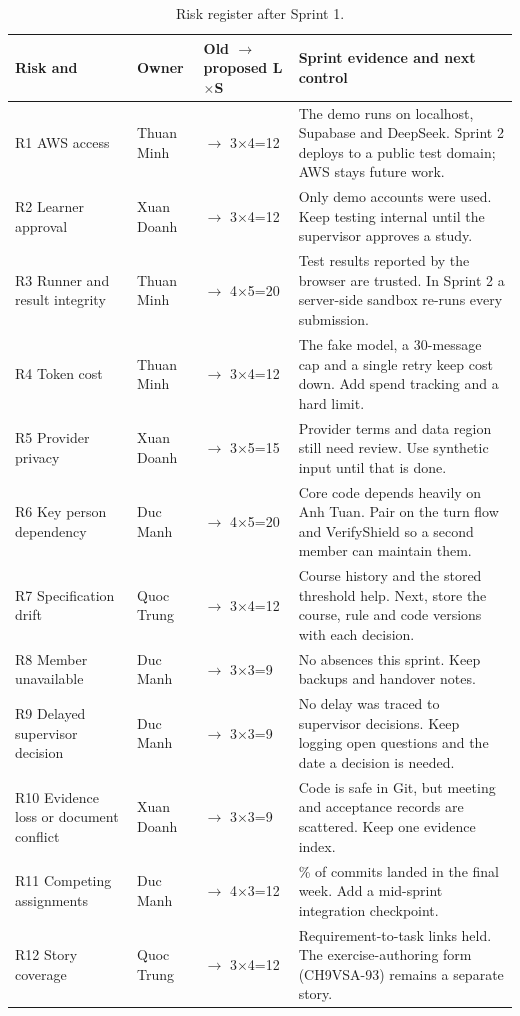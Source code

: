 \documentclass[11pt,a4paper]{article}
\begin{document}
{\small
\begin{longtable}{>{\raggedright\arraybackslash}p{}>{\raggedright\arraybackslash}p{}>{\raggedright\arraybackslash}p{}>{\raggedright\arraybackslash}p{}}
\caption{Risk register after Sprint 1.}\\
\toprule
\textbf{Risk and } & \textbf{Owner} & \textbf{Old $\rightarrow$ proposed L$\times$S} & \textbf{Sprint evidence and next control} \\
\midrule
\endhead
R1 AWS access & Thuan Minh & 12 $\rightarrow$ 3$\times$4=12 & The demo runs on localhost, Supabase and DeepSeek. Sprint 2 deploys to a public test domain; AWS stays future work. \\
R2 Learner approval & Xuan Doanh & 12 $\rightarrow$ 3$\times$4=12 & Only demo accounts were used. Keep testing internal until the supervisor approves a study. \\
R3 Runner and result integrity & Thuan Minh & 15 $\rightarrow$ 4$\times$5=20 & Test results reported by the browser are trusted. In Sprint 2 a server-side sandbox re-runs every submission. \\
R4 Token cost & Thuan Minh & 12 $\rightarrow$ 3$\times$4=12 & The fake model, a 30-message cap and a single retry keep cost down. Add spend tracking and a hard limit. \\
R5 Provider privacy & Xuan Doanh & 15 $\rightarrow$ 3$\times$5=15 & Provider terms and data region still need review. Use synthetic input until that is done. \\
R6 Key person dependency & Duc Manh & 16 $\rightarrow$ 4$\times$5=20 & Core code depends heavily on Anh Tuan. Pair on the turn flow and VerifyShield so a second member can maintain them. \\
R7 Specification drift & Quoc Trung & 12 $\rightarrow$ 3$\times$4=12 & Course history and the stored threshold help. Next, store the course, rule and code versions with each decision. \\
R8 Member unavailable & Duc Manh & 9 $\rightarrow$ 3$\times$3=9 & No absences this sprint. Keep backups and handover notes. \\
R9 Delayed supervisor decision & Duc Manh & 9 $\rightarrow$ 3$\times$3=9 & No delay was traced to supervisor decisions. Keep logging open questions and the date a decision is needed. \\
R10 Evidence loss or document conflict & Xuan Doanh & 9 $\rightarrow$ 3$\times$3=9 & Code is safe in Git, but meeting and acceptance records are scattered. Keep one evidence index. \\
R11 Competing assignments & Duc Manh & 12 $\rightarrow$ 4$\times$3=12 & 65.7\% of commits landed in the final week. Add a mid-sprint integration checkpoint. \\
R12 Story coverage & Quoc Trung & 12 $\rightarrow$ 3$\times$4=12 & Requirement-to-task links held. The exercise-authoring form (CH9VSA-93) remains a separate story. \\
\bottomrule
\end{longtable}}
\end{document}
